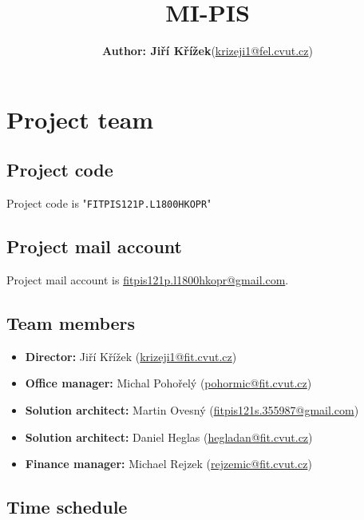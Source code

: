 \documentclass[12pt]{article}
\begin{document}
\title{MI-PIS}


\dmyyyydate


\author{
\begin{tabular}{ l r } 
  \bf Author: Jiří Křížek & (\url{krizeji1@fel.cvut.cz})
\end{tabular}}

\maketitle


\section{Project team}
  \subsection{Project code}
  Project code is "\texttt{FITPIS121P.L1800HKOPR}"
  
  \subsection{Project mail account}
  Project mail account is \url{fitpis121p.l1800hkopr@gmail.com}.
  
  \subsection{Team members}
    \begin{itemize}
      \item{{\bf Director:} Jiří Křížek (\url{krizeji1@fit.cvut.cz})}
      \item{{\bf Office manager:} Michal Pohořelý (\url{pohormic@fit.cvut.cz})}
      \item{{\bf Solution architect:} Martin Ovesný (\url{fitpis121s.355987@gmail.com})}
      \item{{\bf Solution architect:} Daniel Heglas (\url{hegladan@fit.cvut.cz})}
      \item{{\bf Finance manager:} Michael Rejzek (\url{rejzemic@fit.cvut.cz})}
    \end{itemize}

\subsection{Time schedule}
\end{document}
